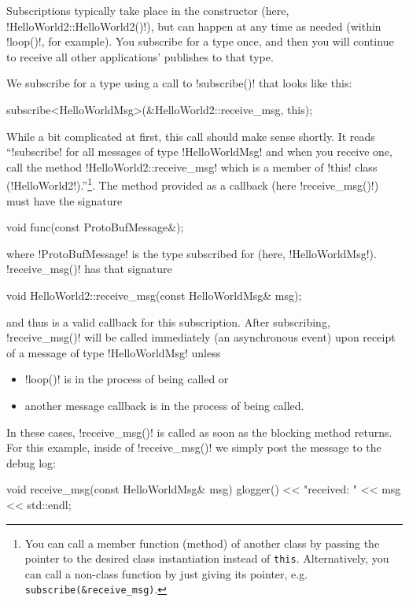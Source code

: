 Subscriptions typically take place in the constructor (here, !HelloWorld2::HelloWorld2()!), but can happen at any time as needed (within !loop()!, for example). You subscribe for a type once, and then you will continue to receive all other applications' publishes to that type.

We subscribe for a type using a call to !subscribe()! that looks like this:
\begin{boxedverbatim}
subscribe<HelloWorldMsg>(&HelloWorld2::receive_msg, this);
\end{boxedverbatim}
\resetbvlinenumber

While a bit complicated at first, this call should make sense shortly. It reads ``!subscribe! for all messages of type !HelloWorldMsg! and when you receive one, call the method !HelloWorld2::receive_msg! which is a member of !this! class (!HelloWorld2!).''\footnote{You can call a member function (method) of another class by passing the pointer to the desired class instantiation instead of \texttt{this}. Alternatively, you can call a non-class function by just giving its pointer, e.g. \texttt{subscribe(\&receive\_msg)}.}. The method provided as a callback (here !receive_msg()!) must have the signature
\begin{boxedverbatim}
void func(const ProtoBufMessage&); 
\end{boxedverbatim}
\resetbvlinenumber
where !ProtoBufMessage! is the type subscribed for (here, !HelloWorldMsg!). !receive_msg()! has that signature
\begin{boxedverbatim}
void HelloWorld2::receive_msg(const HelloWorldMsg& msg);
\end{boxedverbatim}
\resetbvlinenumber
and thus is a valid callback for this subscription. After subscribing, !receive_msg()! will be called immediately (an \gls{asynchronous} event) upon receipt of a message of type !HelloWorldMsg! unless
\begin{itemize}
\item !loop()! is in the process of being called or
\item another message callback is in the process of being called.
\end{itemize}
In these cases, !receive_msg()! is called as soon as the blocking method returns. For this example, inside of !receive_msg()! we simply post the message to the debug log:

\begin{boxedverbatim}
void receive_msg(const HelloWorldMsg& msg)
{
   glogger() << "received: " << msg << std::endl;
}
\end{boxedverbatim}
\resetbvlinenumber

